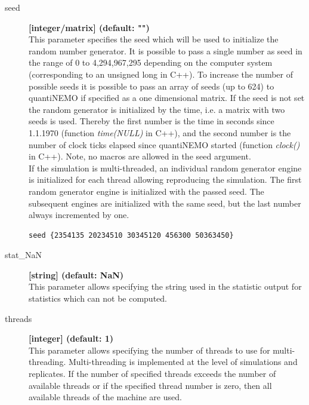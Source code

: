 \documentclass[letterpaper,12pt,oneside]{book}
\begin{document}
\begin{description}
\item[seed] \textbf{[integer/matrix] (default: "")}\\
This parameter specifies the seed which will be used to initialize the random number generator. It is possible to pass a single number as seed in the range of 0 to 4,294,967,295 depending on the computer system (corresponding to an unsigned long in C++). To increase the number of possible seeds it is possible to pass an array of seeds (up to 624) to quantiNEMO if specified as a one dimensional matrix. If the seed is not set the random generator is initialized by the time, i.e. a matrix with two seeds is used. Thereby the first number is the time in seconds since 1.1.1970 (function \textit{time(NULL)} in C++), and the second number is the number of clock ticks elapsed since quantiNEMO started (function \textit{clock()} in C++). Note, no macros are allowed in the seed argument.\\
If the simulation is multi-threaded, an individual random generator engine is initialized for each thread allowing reproducing the simulation. The first random generator engine is initialized with the passed seed. The subsequent engines are initialized with the same seed, but the last number always incremented by one. 
\begin{lstlisting}[frame=single]
seed {2354135 20234510 30345120 456300 50363450}
\end{lstlisting}

\item[stat\_NaN] \textbf{[string] (default: NaN)}\\
This parameter allows specifying the string used in the statistic output for statistics which can not be computed.

\item[threads] \textbf{[integer] (default: 1)}\\
This parameter allows specifying the number of threads to use for multi-threading. Multi-threading is implemented at the level of simulations and replicates. If the number of specified threads exceeds the number of available threads or if the specified thread number is zero, then all available threads of the machine are used.


\end{description}
\end{document}
